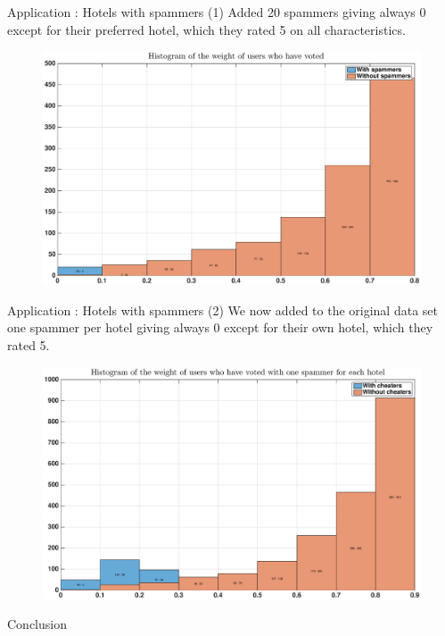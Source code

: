 \begin{frame}{Application : Hotels with spammers (1)}
    Added 20 spammers giving always 0 except for their preferred hotel, which they rated 5 on all characteristics.
            \begin{figure}
            \centering
            \includegraphics[width=\textwidth]{../rapport/images/hotels/not_random_cheaters.eps}
        \end{figure}
\end{frame}

\begin{frame}{Application : Hotels with spammers (2)}
    We now added to the original data set one spammer per hotel giving always 0 except for their own hotel, which they rated 5.
            \begin{figure}
            \centering
            \includegraphics[width=\textwidth]{../rapport/images/hotels/not_random_each_hotels.eps}
        \end{figure}
\end{frame}

\begin{frame}{Conclusion}

\end{frame}